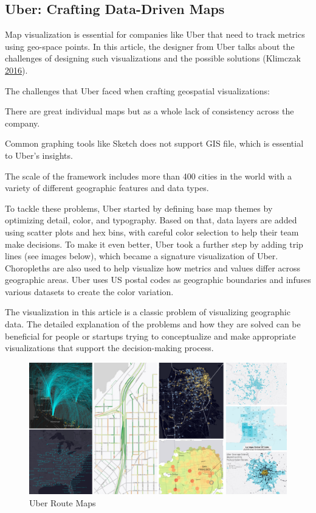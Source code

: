 \documentclass[]{book}
\begin{document}
\hypertarget{uber-crafting-data-driven-maps}{%
\subsection{Uber: Crafting Data-Driven Maps}\label{uber-crafting-data-driven-maps}}

Map visualization is essential for companies like Uber that need to track metrics using geo-space points. In this article, the designer from Uber talks about the challenges of designing such visualizations and the possible solutions (Klimczak \protect\hyperlink{ref-uber_maps}{2016}).

The challenges that Uber faced when crafting geospatial visualizations:

There are great individual maps but as a whole lack of consistency across the company.

Common graphing tools like Sketch does not support GIS file, which is essential to Uber's insights.

The scale of the framework includes more than 400 cities in the world with a variety of different geographic features and data types.

To tackle these problems, Uber started by defining base map themes by optimizing detail, color, and typography. Based on that, data layers are added using scatter plots and hex bins, with careful color selection to help their team make decisions. To make it even better, Uber took a further step by adding trip lines (see images below), which became a signature visualization of Uber. Choropleths are also used to help visualize how metrics and values differ across geographic areas. Uber uses US postal codes as geographic boundaries and infuses various datasets to create the color variation.

The visualization in this article is a classic problem of visualizing geographic data. The detailed explanation of the problems and how they are solved can be beneficial for people or startups trying to conceptualize and make appropriate visualizations that support the decision-making process.

\begin{figure}
\centering
\includegraphics{images/uber_map.png}
\caption{Uber Route Maps}
\end{figure}
\end{document}
